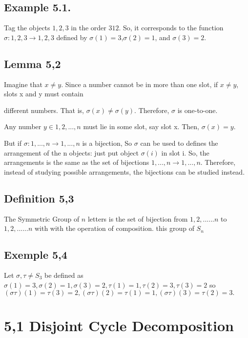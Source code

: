 \subsection{Example 5.1.} 
Tag the objects $1, 2, 3$ in the order $3 1 2$. So, it corresponds to the function $\sigma: {1, 2, 3} \rightarrow {1, 2, 3}$
defined by $\sigma(1) = 3$,$\sigma(2) = 1$, and $\sigma(3) = 2$.

\subsection{Lemma 5,2}

Imagine that $x\neq y$. Since a number cannot be in more than one slot, if $x \neq y$, slots x and y must contain

different numbers. That is, $\sigma(x) \neq \sigma(y)$. Therefore, $\sigma$ is one-to-one.

Any number $y \in {1, 2, . . . , n}$ must lie in some slot, say slot x. Then, $\sigma(x) = y$.

But if $\sigma: {1, . . . , n} \rightarrow {1, . . . , n}$ is a bijection, So $\sigma$ can be used to defines the arrangement of the n
objects: just put object $\sigma(i)$ in slot i. So, the arrangements is the same as the set of
bijections ${1, . . . , n} \rightarrow {1, . . . , n}$. Therefore, instead of studying possible arrangements, the bijections can be studied instead.

\subsection{Definition 5,3}

The Symmetric Group of $n$ letters is the set of bijection from ${1,2,......n}$ to ${1,2,......n}$ with with the operation of composition.
this group of $S_n$

\subsection{Exemple 5,4}

Let $\sigma,\tau \neq S_3$ be defined as $\sigma(1)=3, \sigma(2)=1, \sigma(3)=2, \tau(1)=1,\tau(2)=3,\tau(3)=2$ so $(\sigma\tau)(1)=\tau(3)=2,(\sigma\tau)(2)=\tau(1)=1, (\sigma\tau)(3)=\tau(2)=3.$

\section{5,1 Disjoint Cycle Decomposition}

